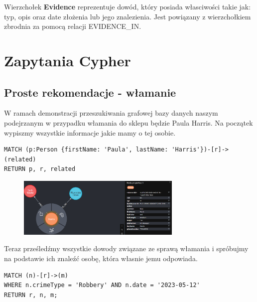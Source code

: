 \documentclass[a4paper,12pt]{article}
\begin{document}
Wierzchołek \textbf{Evidence} reprezentuje dowód, który posiada własciwości takie jak: typ, opis oraz date złożenia lub jego znalezienia. Jest powiązany z wierzchołkiem zbrodnia za pomocą relacji EVIDENCE\_IN.

\section{Zapytania Cypher}

\subsection{Proste rekomendacje - włamanie}

W ramach demonstracji przeszukiwania grafowej bazy danych naszym podejrzanym w przypadku włamania do sklepu będzie Paula Harris. Na początek wypiszmy wszystkie informacje jakie mamy o tej osobie.

\begin{center}
\begin{minipage}{0.8\linewidth}
\begin{lstlisting}[language=Cypher, basicstyle=\small, breaklines=true]
MATCH (p:Person {firstName: 'Paula', lastName: 'Harris'})-[r]->(related)
RETURN p, r, related
\end{lstlisting}
\end{minipage}
\end{center}

\begin{figure}[h!]
    \centering
    \includegraphics[width=0.7\textwidth]{paula_harris.png}
\end{figure}

Teraz prześledźmy wszystkie dowody związane ze sprawą włamania i spróbujmy na podstawie ich znaleźć osobę, która własnie jemu odpowiada.

\begin{center}
\begin{minipage}{0.8\linewidth}
\begin{lstlisting}[language=Cypher, basicstyle=\small, breaklines=true]
MATCH (n)-[r]->(m)
WHERE n.crimeType = 'Robbery' AND n.date = '2023-05-12' 
RETURN r, n, m;
\end{lstlisting}
\end{minipage}
\end{center}
\end{document}
